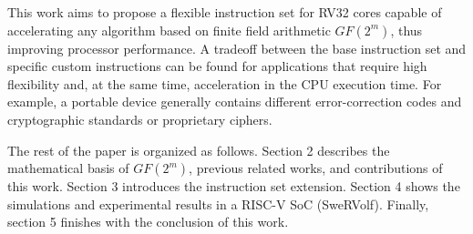 This work aims to propose a flexible instruction set for RV32 cores
capable of accelerating any algorithm based on finite field arithmetic $GF(2^m)$, thus improving processor performance. A tradeoff 
between the base instruction set and specific custom instructions can be found for applications that require high flexibility and, 
at the same time, acceleration in the CPU execution time. For example, a portable device generally contains different error-correction codes 
and cryptographic standards or proprietary ciphers.


The rest of the paper is organized as follows. Section 2 describes the mathematical basis of $GF(2^m)$, previous related works, 
and contributions of this work. Section 3 introduces the instruction set extension. Section 4 shows the simulations and 
experimental results in a RISC-V SoC (SweRVolf). Finally, section 5 finishes with the conclusion of this work.


